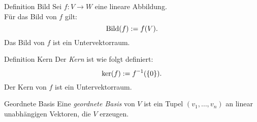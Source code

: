 \documentclass[main.tex]{subfiles}
\begin{document}
\begin{karte}{Definition Bild}
    Sei \( f: V \rightarrow W \) eine lineare Abbildung.\\
    Für das Bild von \(f\) gilt:
    \[ \operatorname{Bild}(f) := f(V). \]
    Das Bild von \(f\) ist ein Untervektorraum.
\end{karte}
\begin{karte}{Definition Kern}
    Der \textit{Kern} ist wie folgt definiert:
    \[ \ker(f) := \inverse{f}(\set{0}). \]
    Der Kern von \(f\) ist ein Untervektorraum.
\end{karte}
\begin{karte}{Geordnete Basis}
    Eine \textit{geordnete Basis} von \(V\) ist ein Tupel \( (v_1,\ldots,v_n) \) 
    an linear unabhängigen Vektoren, die \(V\) erzeugen.
\end{karte}
\end{document}
